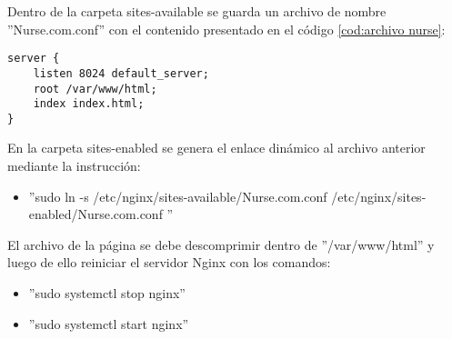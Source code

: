\pagebreak
Dentro de la carpeta sites-available se guarda un archivo de nombre ''Nurse.com.conf'' con el contenido presentado en el código \ref{cod:archivo nurse}:

\begin{lstlisting}[label=cod:archivo nurse, caption=Archivo \\/etc/nginx/sites-available/Nurse.com.conf.]
server {
	listen 8024 default_server;
	root /var/www/html;
	index index.html;
}
\end{lstlisting}

En la carpeta sites-enabled se genera el enlace dinámico al archivo anterior mediante la instrucción:
\begin{itemize}
\item ''sudo ln -s /etc/nginx/sites-available/Nurse.com.conf /etc/nginx/sites-enabled/Nurse.com.conf ''
\end{itemize}

El archivo de la página se debe descomprimir dentro de ''/var/www/html'' y luego de ello reiniciar el servidor Nginx con los comandos:
\begin{itemize}
\item ''sudo systemctl stop nginx'' 
\item ''sudo systemctl start nginx''
\end{itemize}






